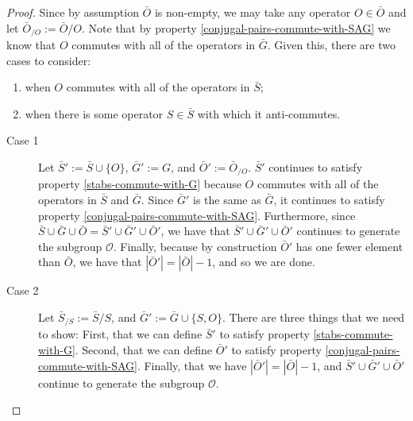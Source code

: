 \documentclass[twocolumn,showpacs,preprintnumbers,amsmath,amssymb,nofootinbib,pra,floatfix]{revtex4}
\begin{document}
\begin{proof}
Since by assumption $\bar O$ is non-empty, we may take any operator $O\in \bar O$ and let $\bar O_{\slash O}:=\bar O\slash O$.  Note that by property \ref{conjugal-pairs-commute-with-SAG} we know that $O$ commutes with all of the operators in $\bar G$.  Given this, there are two cases to consider:
\begin{enumerate}
\item when $O$ commutes with all of the operators in $\bar S$;
\item when there is some operator $S\in\bar S$ with which it anti-commutes.
\end{enumerate}

\begin{description}
\item[Case 1]
Let $\bar S':= \bar S \cup \{O\}$, $\bar G' := G$, and $\bar O' := \bar O_{\slash O}$.  $\bar S'$ continues to satisfy property \ref{stabs-commute-with-G} because $O$ commutes with all of the operators in $\bar S$ and $\bar G$.  Since $\bar G'$ is the same as $\bar G$, it continues to satisfy property \ref{conjugal-pairs-commute-with-SAG}.  Furthermore, since $\bar S\cup \bar G \cup \bar O=\bar S' \cup \bar G' \cup \bar O'$, we have that $\bar S' \cup \bar G' \cup \bar O'$ continues to generate the subgroup $\mathcal{O}$.  Finally, because by construction $\bar O'$ has one fewer element than $\bar O$, we have that $|\bar O'|=|\bar O|-1$, and so we are done.
\item[Case 2]
Let $\bar S_{\slash S}:=\bar S\slash S$, and $\bar G' := \bar G \cup \{S,O\}$.  There are three things that we need to show:  First, that we can define $\bar S'$ to satisfy property \ref{stabs-commute-with-G}.  Second, that we can define $\bar O'$ to satisfy property \ref{conjugal-pairs-commute-with-SAG}.  Finally, that we have $|\bar O'|=|\bar O|-1$, and  $\bar S' \cup \bar G' \cup \bar O'$ continue to generate the subgroup $\mathcal{O}$.


\end{description}
\end{proof}
\end{document}
